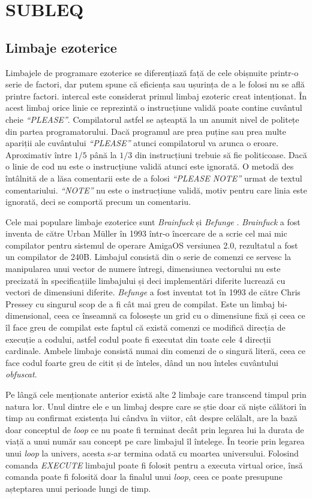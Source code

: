 \documentclass[../main.tex]{subfiles}
\begin{document}
\section{SUBLEQ}
\subsection{Limbaje ezoterice}
Limbajele de programare ezoterice se diferențiază față de cele obișnuite printr-o serie de factori, dar putem
spune că eficiența sau ușurința de a le folosi nu se află printre factori. \acrshort{intercal} \cite{intercal} 
este considerat primul limbaj ezoteric creat intenționat. În acest limbaj orice linie ce reprezintă o instrucțiune
validă poate contine cuvântul cheie \emph{``PLEASE''}. Compilatorul astfel se așteaptă la un anumit nivel de politețe
din partea programatorului. Dacă programul are prea puține sau prea multe apariții ale cuvântului \emph{``PLEASE''}
atunci compilatorul va arunca o eroare. Aproximativ între $1/5$ până la $1/3$ din instrucțiuni trebuie să fie
politicoase. Dacă o linie de cod nu este o instrucțiune validă atunci este ignorată. O metodă des întâlnită de a
lăsa comentarii este de a folosi \emph{``PLEASE NOTE''} urmat de textul comentariului. \emph{``NOTE''} nu este
o instrucțiune validă, motiv pentru care linia este ignorată, deci se comportă precum un comentariu.

Cele mai populare limbaje ezoterice sunt \emph{Brainfuck} \cite{brainfuck} și \emph{Befunge} \cite{befunge}.
\emph{Brainfuck} \cite{brainfuck} a fost inventa de către Urban Müller în 1993 într-o încercare de a scrie cel mai mic 
compilator pentru sistemul de operare AmigaOS versiunea 2.0, rezultatul a fost un compilator de 240B. Limbajul
consistă din o serie de comenzi ce servesc la manipularea unui vector de numere întregi, dimensiunea vectorului
nu este precizată în specificațiile limbajului și deci implementări diferite lucrează cu vectori de dimensiuni
diferite. \emph{Befunge} \cite{befunge} a fost inventat tot în 1993 de către Chris Pressey cu singurul scop de
a fi cât mai greu de compilat. Este un limbaj bi-dimensional, ceea ce înseamnă ca folosește un grid cu o dimensiune
fixă și ceea ce îl face greu de compilat este faptul că există comenzi ce modifică direcția de execuție a codului,
astfel codul poate fi executat din toate cele 4 direcții cardinale. Ambele limbaje consistă numai din comenzi de o 
singură literă, ceea ce face codul foarte greu de citit și de înteles, dând un nou înteles cuvântului \emph{obfuscat}.

Pe lângă cele menționate anterior există alte 2 limbaje care transcend timpul prin natura lor. Unul dintre ele
e un limbaj despre care se știe doar că niște călători în timp au confirmat existența lui cândva în viitor, cât
despre celălalt, are la bază doar conceptul de \emph{loop} ce nu poate fi terminat decât prin legarea lui la
durata de viață a unui număr sau concept pe care limbajul îl întelege. În teorie prin legarea unui \emph{loop} la univers,
acesta s-ar termina odată cu moartea universului. Folosind comanda \emph{EXECUTE} limbajul poate fi folosit pentru a
executa virtual orice, însă comanda poate fi folosită doar la finalul unui \emph{loop}, ceea ce poate presupune
așteptarea unui perioade lungi de timp.
\end{document}
